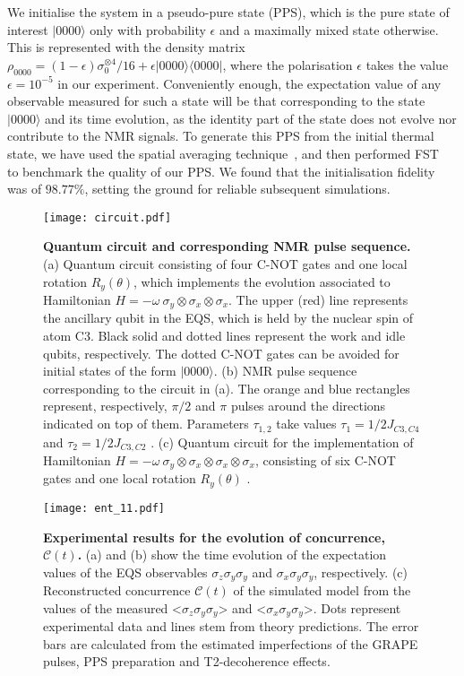\documentclass[10pt,nofootinbib,notitlepage,twocolumn,superscriptaddress]{revtex4-1}
\theoremstyle{plain}
\theoremstyle{definition}
\newcommand{\bra}[1]{\mbox{$\langle #1|$}}
\newcommand{\ket}[1]{\ensuremath{|#1\rangle}}
\begin{document}
We initialise the system in a pseudo-pure state (PPS), which is the pure state of interest $| 0 0 0 0 \rangle $ only with probability $\epsilon$ and a maximally mixed state otherwise. This is represented with the density matrix $\rho_{0000}=(1-\epsilon)\sigma_0^{\otimes 4}/16+\epsilon\ket{0000}\bra{0000}$, where the polarisation $\epsilon$ takes the value $\epsilon=10^{-5}$ in our experiment. Conveniently enough, the expectation value of any observable measured for such a state will be that corresponding to the state $\ket{0000}$ and its time evolution, as the identity part of the state does not evolve nor contribute to the NMR signals. To generate this PPS from the initial thermal state, we have used the spatial averaging technique~\cite{cory1,cory2,dawei2}, and then performed FST~\cite{Leskowitz, JSlee} to benchmark the quality of our PPS.  We found that the initialisation fidelity was of $98.77\%$, setting the ground for reliable subsequent simulations.

\begin{figure*}[htb]
\begin{center}
\texttt{[image: circuit.pdf]}
\end{center}
\setlength{\abovecaptionskip}{-0.00cm}
\caption{\footnotesize{\textbf{Quantum circuit and corresponding NMR pulse sequence.} (a) Quantum circuit consisting of four C-NOT gates and one local rotation $R_y(\theta)$, which implements the evolution associated to Hamiltonian $H=-\omega\  \sigma_y \otimes \sigma_x \otimes \sigma_x$. The upper (red) line represents the ancillary qubit in the EQS, which is held by the nuclear spin of atom C3. Black solid and dotted lines represent the work and idle qubits, respectively. The dotted C-NOT gates can be avoided for initial states of the form $\ket{0000}$. (b) NMR pulse sequence corresponding to the circuit in (a). The orange and blue rectangles represent, respectively, $\pi/2$ and $\pi$ pulses around the directions indicated on top of them. Parameters $\tau_{1,2}$ take values $\tau_1=1/2J_{C3,C4}$ and $\tau_2=1/2J_{C3,C2}$ . (c) Quantum circuit for the implementation of Hamiltonian $H=-\omega\  \sigma_y\otimes \sigma_x\otimes \sigma_x\otimes \sigma_x$, consisting of six C-NOT gates and one local rotation $R_y(\theta)$ . }} \label{circuit}
\end{figure*}
\begin{figure}[htb!]
\begin{center}
\texttt{[image: ent\_11.pdf]}
\end{center}
\setlength{\abovecaptionskip}{-0.00cm}
\caption{\footnotesize{\textbf{Experimental results for the evolution of concurrence, $\mathcal{C}(t)$.} (a) and (b) show the time evolution of the expectation values of the EQS observables $\sigma_z\sigma_y\sigma_y$ and $\sigma_x\sigma_y\sigma_y$, respectively. (c) Reconstructed concurrence $\mathcal{C}(t)$ of the simulated model from the values of the measured <$\sigma_z\sigma_y\sigma_y$> and <$\sigma_x\sigma_y\sigma_y$>. Dots represent experimental data and lines stem from theory predictions. The error bars are calculated from the estimated imperfections of the GRAPE pulses, PPS preparation and T2-decoherence effects.}}\label{ent_1}
\end{figure}
\end{document}
